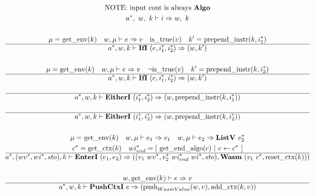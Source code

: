\begin{gather*}
  \text{NOTE: input cont is always \algo} \\
  \seq{a}, ~ w, ~ k \vdash i \Rightarrow w, ~ k \\
%
\newline \\
  \mu = \getenv(k) \quad w, \mu \vdash e \Rightarrow v \quad
  \istrue(v) \quad k' = \prependinstr(k, \seq{i_1}) \\
  \hline
  \seq{a}, w, k \vdash \ifi ~ (e, \seq{i_1}, \seq{i_2}) \Rightarrow (w, k') \\
%
\newline \\
  \mu = \getenv(k) \quad w, \mu \vdash e \Rightarrow v \quad
  \neg \istrue(v) \quad k' = \prependinstr(k, \seq{i_2}) \\
  \hline
  \seq{a}, w, k \vdash \ifi ~ (e, \seq{i_1}, \seq{i_2}) \Rightarrow (w, k') \\
%
\newline \\
  \hline
  \seq{a}, w, k \vdash \eitheri ~ (\seq{i_1}, \seq{i_2}) \Rightarrow (w, \prependinstr(k, \seq{i_1})) \\
%
\newline \\
  \hline
  \seq{a}, w, k \vdash \eitheri ~ (\seq{i_1}, \seq{i_2}) \Rightarrow (w, \prependinstr(k, \seq{i_2})) \\
%
\newline \\
  \mu = \getenv(k) \quad
  w, \mu \vdash e_1 \Rightarrow v_1 \quad
  w, \mu \vdash e_2 \Rightarrow \listv ~ \seq{v_2} \\
  \seq c = \getctx(k) \quad
  \seq{wi_{end}} = [ ~ \getendalgo(c) ~ | ~ c \leftarrow \seq c ~ ] \\
  \hline
  \seq{a}, (\seq{wv}, \seq{wi}, sto), k \vdash \enteri ~ (e_1, e_2)
  \Rightarrow
  ((v_1 ~ \seq{wv}, \seq{v_2} ~ \seq{wi_{end}}~ \seq{wi}, sto), \wasm ~ (v_1 ~ \seq c, \resetctx(k))) \\
%
\newline \\
  w, \getenv(k) \vdash e \Rightarrow v \\
  \hline
  \seq{a}, w, k \vdash \pushctxi ~ e
  \Rightarrow
  (\push_{WasmValue}(w, v), \addctx(k, v)) \\
%
\newline \\

\end{gather*}
